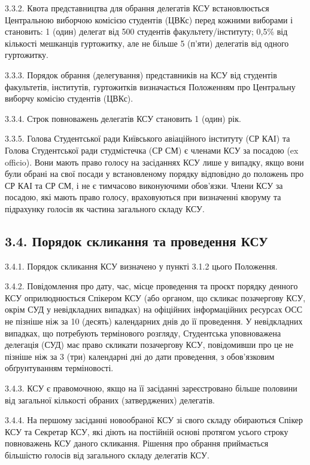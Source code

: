     3.3.2. Квота представництва для обрання делегатів КСУ встановлюється Центральною виборчою комісією студентів (ЦВКс) перед кожними виборами і становить: 1 (один) делегат від 500 студентів факультету/інституту; 0,5\% від кількості мешканців гуртожитку, але не більше 5 (п'яти) делегатів від одного гуртожитку.

    3.3.3. Порядок обрання (делегування) представників на КСУ від студентів факультетів, інститутів, гуртожитків визначається Положенням про Центральну виборчу комісію студентів (ЦВКс).

    3.3.4. Строк повноважень делегатів КСУ становить 1 (один) рік.

    3.3.5. Голова Студентської ради Київського авіаційного інституту (СР КАІ) та Голова Студентської ради студмістечка (СР СМ) є членами КСУ за посадою (ex officio). Вони мають право голосу на засіданнях КСУ лише у випадку, якщо вони були обрані на свої посади у встановленому порядку відповідно до положень про СР КАІ та СР СМ, і не є тимчасово виконуючими обов'язки. Члени КСУ за посадою, які мають право голосу, враховуються при визначенні кворуму та підрахунку голосів як частина загального складу КСУ.

\subsection*{3.4. Порядок скликання та проведення КСУ}
    3.4.1. Порядок скликання КСУ визначено у пункті 3.1.2 цього Положення.

    3.4.2. Повідомлення про дату, час, місце проведення та проєкт порядку денного КСУ оприлюднюється Спікером КСУ (або органом, що скликає позачергову КСУ, окрім СУД у невідкладних випадках) на офіційних інформаційних ресурсах ОСС не пізніше ніж за 10 (десять) календарних днів до її проведення. У невідкладних випадках, що потребують термінового розгляду, Студентська уповноважена делегація (СУД) має право скликати позачергову КСУ, повідомивши про це не пізніше ніж за 3 (три) календарні дні до дати проведення, з обов'язковим обґрунтуванням терміновості.

    3.4.3. КСУ є правомочною, якщо на її засіданні зареєстровано більше половини від загальної кількості обраних (затверджених) делегатів.

    3.4.4. На першому засіданні новообраної КСУ зі свого складу обираються Спікер КСУ та Секретар КСУ, які діють на постійній основі протягом усього строку повноважень КСУ даного скликання. Рішення про обрання приймається більшістю голосів від загального складу делегатів КСУ.

